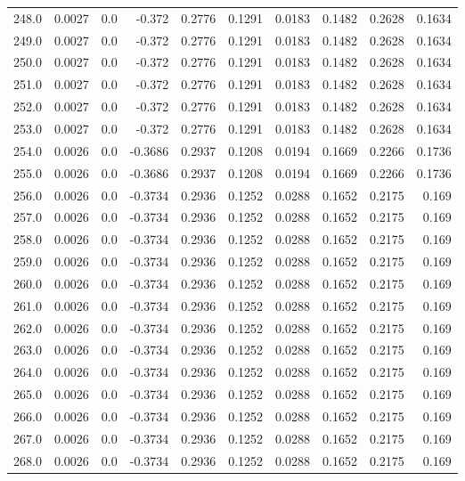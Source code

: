 \begin{longtable}{lrrrrrrrrr}
248.0 & 0.0027 & 0.0 & -0.372 & 0.2776 & 0.1291 & 0.0183 & 0.1482 & 0.2628 & 0.1634 \\
249.0 & 0.0027 & 0.0 & -0.372 & 0.2776 & 0.1291 & 0.0183 & 0.1482 & 0.2628 & 0.1634 \\
250.0 & 0.0027 & 0.0 & -0.372 & 0.2776 & 0.1291 & 0.0183 & 0.1482 & 0.2628 & 0.1634 \\
251.0 & 0.0027 & 0.0 & -0.372 & 0.2776 & 0.1291 & 0.0183 & 0.1482 & 0.2628 & 0.1634 \\
252.0 & 0.0027 & 0.0 & -0.372 & 0.2776 & 0.1291 & 0.0183 & 0.1482 & 0.2628 & 0.1634 \\
253.0 & 0.0027 & 0.0 & -0.372 & 0.2776 & 0.1291 & 0.0183 & 0.1482 & 0.2628 & 0.1634 \\
254.0 & 0.0026 & 0.0 & -0.3686 & 0.2937 & 0.1208 & 0.0194 & 0.1669 & 0.2266 & 0.1736 \\
255.0 & 0.0026 & 0.0 & -0.3686 & 0.2937 & 0.1208 & 0.0194 & 0.1669 & 0.2266 & 0.1736 \\
256.0 & 0.0026 & 0.0 & -0.3734 & 0.2936 & 0.1252 & 0.0288 & 0.1652 & 0.2175 & 0.169 \\
257.0 & 0.0026 & 0.0 & -0.3734 & 0.2936 & 0.1252 & 0.0288 & 0.1652 & 0.2175 & 0.169 \\
258.0 & 0.0026 & 0.0 & -0.3734 & 0.2936 & 0.1252 & 0.0288 & 0.1652 & 0.2175 & 0.169 \\
259.0 & 0.0026 & 0.0 & -0.3734 & 0.2936 & 0.1252 & 0.0288 & 0.1652 & 0.2175 & 0.169 \\
260.0 & 0.0026 & 0.0 & -0.3734 & 0.2936 & 0.1252 & 0.0288 & 0.1652 & 0.2175 & 0.169 \\
261.0 & 0.0026 & 0.0 & -0.3734 & 0.2936 & 0.1252 & 0.0288 & 0.1652 & 0.2175 & 0.169 \\
262.0 & 0.0026 & 0.0 & -0.3734 & 0.2936 & 0.1252 & 0.0288 & 0.1652 & 0.2175 & 0.169 \\
263.0 & 0.0026 & 0.0 & -0.3734 & 0.2936 & 0.1252 & 0.0288 & 0.1652 & 0.2175 & 0.169 \\
264.0 & 0.0026 & 0.0 & -0.3734 & 0.2936 & 0.1252 & 0.0288 & 0.1652 & 0.2175 & 0.169 \\
265.0 & 0.0026 & 0.0 & -0.3734 & 0.2936 & 0.1252 & 0.0288 & 0.1652 & 0.2175 & 0.169 \\
266.0 & 0.0026 & 0.0 & -0.3734 & 0.2936 & 0.1252 & 0.0288 & 0.1652 & 0.2175 & 0.169 \\
267.0 & 0.0026 & 0.0 & -0.3734 & 0.2936 & 0.1252 & 0.0288 & 0.1652 & 0.2175 & 0.169 \\
268.0 & 0.0026 & 0.0 & -0.3734 & 0.2936 & 0.1252 & 0.0288 & 0.1652 & 0.2175 & 0.169 \\

\end{longtable}
